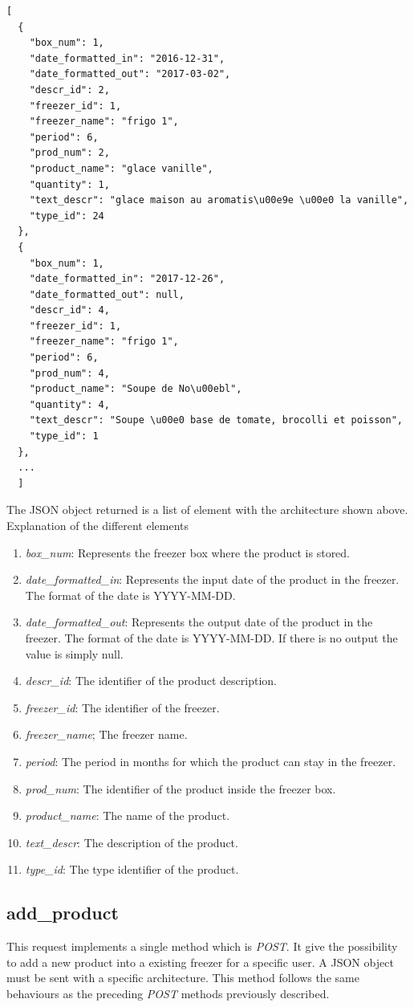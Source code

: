 \begin{lstlisting}
[
  {
    "box_num": 1, 
    "date_formatted_in": "2016-12-31", 
    "date_formatted_out": "2017-03-02", 
    "descr_id": 2, 
    "freezer_id": 1, 
    "freezer_name": "frigo 1", 
    "period": 6, 
    "prod_num": 2, 
    "product_name": "glace vanille", 
    "quantity": 1, 
    "text_descr": "glace maison au aromatis\u00e9e \u00e0 la vanille", 
    "type_id": 24
  },
  {
    "box_num": 1, 
    "date_formatted_in": "2017-12-26", 
    "date_formatted_out": null, 
    "descr_id": 4, 
    "freezer_id": 1, 
    "freezer_name": "frigo 1", 
    "period": 6, 
    "prod_num": 4, 
    "product_name": "Soupe de No\u00ebl", 
    "quantity": 4, 
    "text_descr": "Soupe \u00e0 base de tomate, brocolli et poisson", 
    "type_id": 1
  },
  ...
  ] 
\end{lstlisting}
The JSON object returned is a list of element with the architecture shown above.
Explanation of the different elements
\begin{enumerate}
\item \textit{box\_num}: Represents the freezer box where the product is stored.
\item \textit{date\_formatted\_in}: Represents the input date of the product in the freezer. The format of the date is YYYY-MM-DD.
\item \textit{date\_formatted\_out}: Represents the output date of the product in the freezer. The format of the date is YYYY-MM-DD. If there is no output the value is simply null.
\item \textit{descr\_id}: The identifier of the product description.
\item \textit{freezer\_id}: The identifier of the freezer.
\item \textit{freezer\_name}; The freezer name.
\item \textit{period}: The period in months for which the product can stay in the freezer.
\item \textit{prod\_num}: The identifier of the product inside the freezer box.
\item \textit{product\_name}: The name of the product.
\item \textit{text\_descr}: The description of the product.
\item \textit{type\_id}: The type identifier of the product.
\end{enumerate}

\subsection{add\_product}
This request implements a single method which is \textit{POST}. It give the possibility to add a new product into a existing freezer for a specific user. A JSON object must be sent with a specific architecture. This method follows the same behaviours as the preceding \textit{POST} methods previously described.\\

